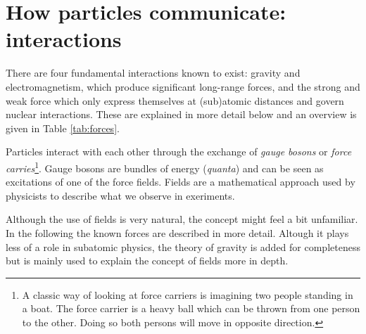 \section{How particles communicate: interactions}

There are four fundamental interactions known to exist: gravity and electromagnetism, which produce significant long-range forces, and the strong and weak force which only express themselves at (sub)atomic distances and govern nuclear interactions. These are explained in more detail below and an overview is given in Table \ref{tab:forces}.

Particles interact with each other through the exchange of \textit{gauge bosons} or \textit{force carries}\footnote{A classic way of looking at force carriers is imagining two people standing in a boat. The force carrier is a heavy ball which can be thrown from one person to the other. Doing so both persons will move in opposite direction.}. Gauge bosons are bundles of energy (\textit{quanta}) and can be seen as excitations of one of the force fields.
Fields are a mathematical approach used by physicists to describe what we observe in exeriments.

Although the use of fields is very natural, the concept might feel a bit unfamiliar. In the following the known forces are described in more detail. Altough it plays less of a role in subatomic physics, the theory of gravity is added for completeness but is mainly used to explain the concept of fields more in depth.

